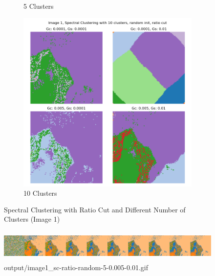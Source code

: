 \documentclass{homework}
\begin{document}
\begin{figure}[H]
\begin{subfigure}{0.32\textwidth}
        \caption{5 Clusters}
    \end{subfigure}
    \begin{subfigure}{0.32\textwidth}
        \centering
        \includegraphics[width=\textwidth]{output_grid/image1_sc-ratio-random-10.png}
        \caption{10 Clusters}
    \end{subfigure}
    \caption{Spectral Clustering with Ratio Cut and Different Number of Clusters (Image 1)}
\end{figure}

\begin{figure}[H]
    \centering
    \includegraphics[height=1.6cm]{output_flatgif/flatgif_image1_sc-ratio-random-5-0.005-0.01.png}
    \caption{output/image1\_sc-ratio-random-5-0.005-0.01.gif}
\end{figure}
\end{document}
